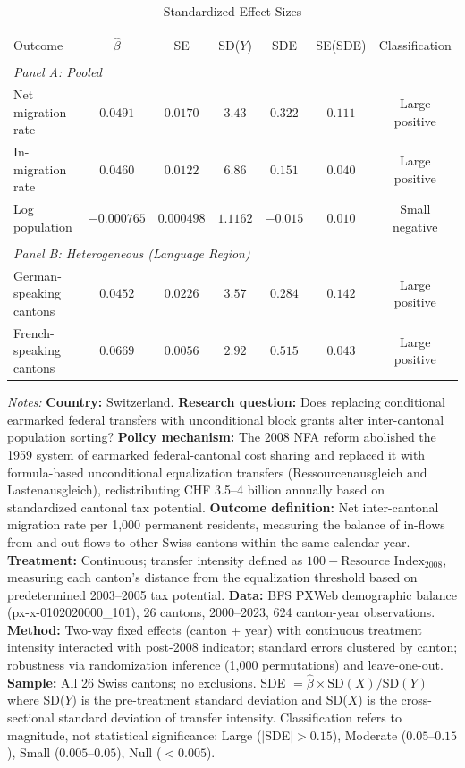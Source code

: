 \begin{table}[t]
\centering
\caption{Standardized Effect Sizes}
\label{tab:sde}
\small
\begin{threeparttable}
\begin{tabular}{lcccccc}
\hline\hline
\\[-1.8ex]
Outcome & $\hat{\beta}$ & SE & SD($Y$) & SDE & SE(SDE) & Classification \\
\hline
\\[-1.8ex]
\multicolumn{7}{l}{\textit{Panel A: Pooled}} \\[3pt]
Net migration rate & $0.0491$ & $0.0170$ & $3.43$ & $0.322$ & $0.111$ & Large positive \\
In-migration rate & $0.0460$ & $0.0122$ & $6.86$ & $0.151$ & $0.040$ & Large positive \\
Log population & $-0.000765$ & $0.000498$ & $1.1162$ & $-0.015$ & $0.010$ & Small negative \\
\\[6pt]
\multicolumn{7}{l}{\textit{Panel B: Heterogeneous (Language Region)}} \\[3pt]
German-speaking cantons & $0.0452$ & $0.0226$ & $3.57$ & $0.284$ & $0.142$ & Large positive \\
French-speaking cantons & $0.0669$ & $0.0056$ & $2.92$ & $0.515$ & $0.043$ & Large positive \\
\hline\hline
\end{tabular}
\begin{tablenotes}
\item \textit{Notes:} \textbf{Country:} Switzerland. \textbf{Research question:} Does replacing conditional earmarked federal transfers with unconditional block grants alter inter-cantonal population sorting? \textbf{Policy mechanism:} The 2008 NFA reform abolished the 1959 system of earmarked federal-cantonal cost sharing and replaced it with formula-based unconditional equalization transfers (Ressourcenausgleich and Lastenausgleich), redistributing CHF 3.5--4 billion annually based on standardized cantonal tax potential. \textbf{Outcome definition:} Net inter-cantonal migration rate per 1{,}000 permanent residents, measuring the balance of in-flows from and out-flows to other Swiss cantons within the same calendar year. \textbf{Treatment:} Continuous; transfer intensity defined as $100 - \text{Resource Index}_{2008}$, measuring each canton's distance from the equalization threshold based on predetermined 2003--2005 tax potential. \textbf{Data:} BFS PXWeb demographic balance (px-x-0102020000\_101), 26 cantons, 2000--2023, 624 canton-year observations. \textbf{Method:} Two-way fixed effects (canton + year) with continuous treatment intensity interacted with post-2008 indicator; standard errors clustered by canton; robustness via randomization inference (1{,}000 permutations) and leave-one-out. \textbf{Sample:} All 26 Swiss cantons; no exclusions. SDE $= \hat{\beta} \times \text{SD}(X) / \text{SD}(Y)$ where SD($Y$) is the pre-treatment standard deviation and SD($X$) is the cross-sectional standard deviation of transfer intensity. Classification refers to magnitude, not statistical significance: Large ($|$SDE$| > 0.15$), Moderate ($0.05$--$0.15$), Small ($0.005$--$0.05$), Null ($< 0.005$).

\end{tablenotes}
\end{threeparttable}
\end{table}
